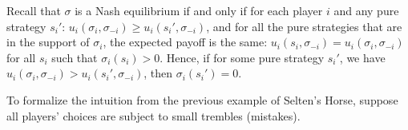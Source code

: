 Recall that $\sigma$ is a Nash equilibrium if and only if for each player $i$ and any pure strategy $s_i'$: $u_i(\sigma_i,\sigma_{-i}) \geq u_i(s_i',\sigma_{-i})$, and for all the pure strategies that are in the support of $\sigma_i$, the expected payoff is the same: $u_i(s_i,\sigma_{-i}) = u_i(\sigma_i,\sigma_{-i})$ for all $s_i$ such that $\sigma_i(s_i) > 0$.
Hence, if for some pure strategy $s_i'$, we have $u_i(\sigma_i,\sigma_{-i}) > u_i(s_i',\sigma_{-i})$, then $\sigma_i(s_i') = 0$.

To formalize the intuition from the previous example of Selten's Horse, suppose all players' choices are subject to small trembles (mistakes).




